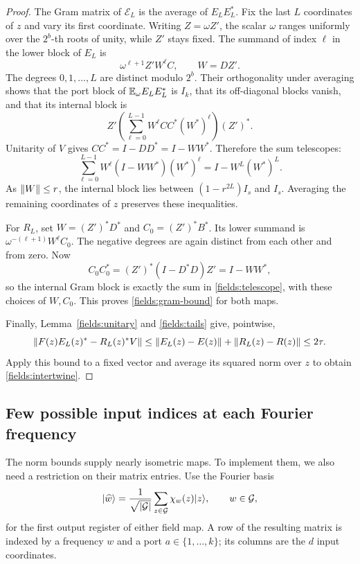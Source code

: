 \begin{proof}
The Gram matrix of $\mathcal E_L$ is the average of $E_LE_L^*$.
Fix the last $L$ coordinates of $z$ and vary its first coordinate.
Writing $Z=\omega Z'$, the scalar $\omega$ ranges uniformly over the
$2^b$-th roots of unity, while $Z'$ stays fixed. The summand of index
$\ell$ in the lower block of $E_L$ is
\[
 \omega^{\ell+1}Z'W^\ell C,\qquad W=DZ'.
\]
The degrees $0,1,\ldots,L$ are distinct modulo $2^b$. Their orthogonality
under averaging shows that the port block of $\mathbb E_\omega E_LE_L^*$ is
$I_k$, that its off-diagonal blocks vanish, and that its internal block is
\[
 Z'\left(\sum_{\ell=0}^{L-1}W^\ell CC^*(W^*)^\ell\right)(Z')^*.
\]
Unitarity of $V$ gives $CC^*=I-DD^*=I-WW^*$. Therefore the sum telescopes:
\begin{equation}\label{fields:telescope}
 \sum_{\ell=0}^{L-1}W^\ell(I-WW^*)(W^*)^\ell
   =I-W^L(W^*)^L.
\end{equation}
As $\lVert W\rVert\le r$, the internal block lies between
$(1-r^{2L})I_s$ and $I_s$. Averaging the remaining coordinates of $z$
preserves these inequalities.

For $R_L$, set $W=(Z')^*D^*$ and $C_0=(Z')^*B^*$. Its lower summand is
$\omega^{-(\ell+1)}W^\ell C_0$. The negative degrees are again distinct
from each other and from zero. Now
\[
 C_0C_0^*=(Z')^*(I-D^*D)Z'=I-WW^*,
\]
so the internal Gram block is exactly the sum in
\eqref{fields:telescope}, with these choices of $W,C_0$.
This proves \eqref{fields:gram-bound} for both maps.

Finally, Lemma~\ref{fields:unitary} and \eqref{fields:tails} give, pointwise,
\[
 \lVert F(z)E_L(z)^*-R_L(z)^*V\rVert
 \le \lVert E_L(z)-E(z)\rVert+\lVert R_L(z)-R(z)\rVert\le2\tau.
\]
Apply this bound to a fixed vector and average its squared norm over $z$
to obtain \eqref{fields:intertwine}.
\end{proof}

\subsection{Few possible input indices at each Fourier frequency}

The norm bounds supply nearly isometric maps. To implement them, we also
need a restriction on their matrix entries. Use the Fourier basis
\[
 \lvert \widehat w\rangle=\frac1{\sqrt{|\mathcal G|}}
    \sum_{z\in\mathcal G}\chi_w(z)\lvert z\rangle,
 \qquad w\in\mathcal G,
\]
for the first output register of either field map. A row of the resulting
matrix is indexed by a frequency $w$ and a port $a\in\{1,\ldots,k\}$;
its columns are the $d$ input coordinates.

